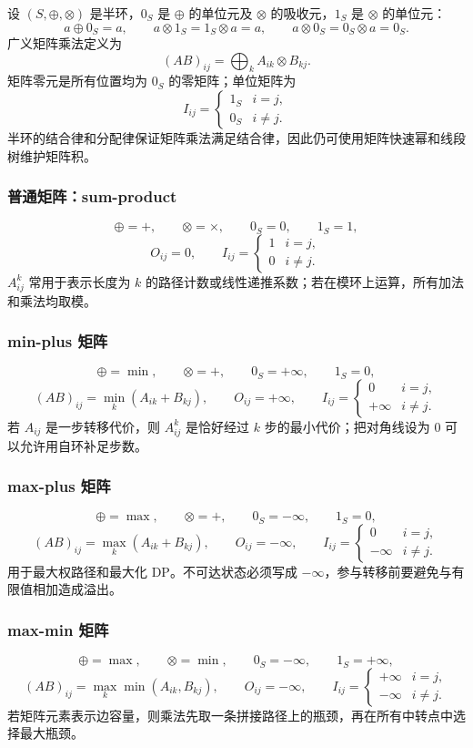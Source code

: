设 $(S,\oplus,\otimes)$ 是半环，$0_S$ 是 $\oplus$ 的单位元及 $\otimes$ 的吸收元，$1_S$ 是 $\otimes$ 的单位元：
\[
  a\oplus0_S=a,\qquad a\otimes1_S=1_S\otimes a=a,
  \qquad a\otimes0_S=0_S\otimes a=0_S.
\]
广义矩阵乘法定义为
\[
  (AB)_{ij}=\bigoplus_k A_{ik}\otimes B_{kj}.
\]
矩阵零元是所有位置均为 $0_S$ 的零矩阵；单位矩阵为
\[
  I_{ij}=\begin{cases}1_S&i=j,\\0_S&i\ne j.\end{cases}
\]
半环的结合律和分配律保证矩阵乘法满足结合律，因此仍可使用矩阵快速幂和线段树维护矩阵积。

\subsubsection*{普通矩阵：sum-product}
\[
  \oplus=+,\qquad \otimes=\times,\qquad 0_S=0,\qquad1_S=1,
\]
\[
  O_{ij}=0,\qquad
  I_{ij}=\begin{cases}1&i=j,\\0&i\ne j.\end{cases}
\]
$A^k_{ij}$ 常用于表示长度为 $k$ 的路径计数或线性递推系数；若在模环上运算，所有加法和乘法均取模。

\subsubsection*{min-plus 矩阵}
\[
  \oplus=\min,\qquad \otimes=+,\qquad 0_S=+\infty,\qquad1_S=0,
\]
\[
  (AB)_{ij}=\min_k(A_{ik}+B_{kj}),\qquad
  O_{ij}=+\infty,\qquad
  I_{ij}=\begin{cases}0&i=j,\\+\infty&i\ne j.\end{cases}
\]
若 $A_{ij}$ 是一步转移代价，则 $A^k_{ij}$ 是恰好经过 $k$ 步的最小代价；把对角线设为 $0$ 可以允许用自环补足步数。

\subsubsection*{max-plus 矩阵}
\[
  \oplus=\max,\qquad \otimes=+,\qquad 0_S=-\infty,\qquad1_S=0,
\]
\[
  (AB)_{ij}=\max_k(A_{ik}+B_{kj}),\qquad
  O_{ij}=-\infty,\qquad
  I_{ij}=\begin{cases}0&i=j,\\-\infty&i\ne j.\end{cases}
\]
用于最大权路径和最大化 DP。不可达状态必须写成 $-\infty$，参与转移前要避免与有限值相加造成溢出。

\subsubsection*{max-min 矩阵}
\[
  \oplus=\max,\qquad \otimes=\min,\qquad
  0_S=-\infty,\qquad1_S=+\infty,
\]
\[
  (AB)_{ij}=\max_k\min(A_{ik},B_{kj}),\qquad
  O_{ij}=-\infty,\qquad
  I_{ij}=\begin{cases}+\infty&i=j,\\-\infty&i\ne j.\end{cases}
\]
若矩阵元素表示边容量，则乘法先取一条拼接路径上的瓶颈，再在所有中转点中选择最大瓶颈。

